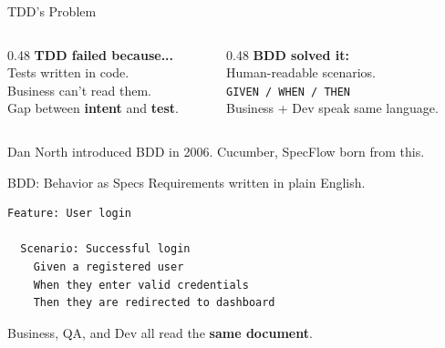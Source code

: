 \documentclass[aspectratio=169,18pt]{beamer}
\begin{document}
\begin{frame}{TDD's Problem}
  \vspace{0.3em}
  \begin{columns}[T]
    \begin{column}{0.48\textwidth}
      \textbf{\color{openred}TDD failed because...}\\[0.6em]
      \normalsize
      Tests written in code.\\[0.4em]
      Business can't read them.\\[0.4em]
      Gap between \textbf{intent} and \textbf{test}.
    \end{column}
    \begin{column}{0.48\textwidth}
      \textbf{\color{opengreen}BDD solved it:}\\[0.6em]
      \normalsize
      Human-readable scenarios.\\[0.4em]
      \texttt{GIVEN / WHEN / THEN}\\[0.4em]
      Business + Dev speak same language.
    \end{column}
  \end{columns}
  \vspace{1em}
  \small\color{opengray}Dan North introduced BDD in 2006. Cucumber, SpecFlow born from this.
\end{frame}

\begin{frame}[fragile]{BDD: Behavior as Specs}
  \vspace{0.3em}
  \large Requirements written in plain English.\\[0.8em]
  \normalsize
\begin{lstlisting}
Feature: User login

  Scenario: Successful login
    Given a registered user
    When they enter valid credentials
    Then they are redirected to dashboard
\end{lstlisting}
  \vspace{0.5em}
  Business, QA, and Dev all read the \textbf{same document}.
\end{frame}
\end{document}
